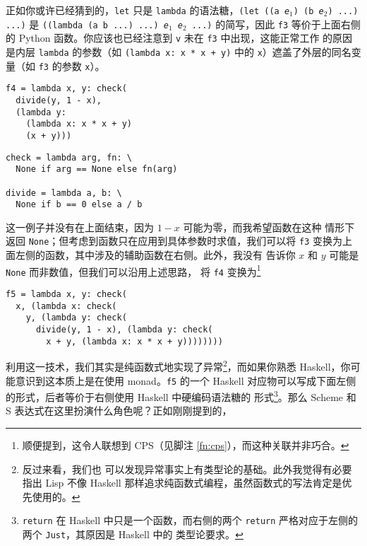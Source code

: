 正如你或许已经猜到的，\verb|let| 只是 \verb|lambda| 的语法糖，\texttt{(let
((a \emph{e$_1$}) (b \emph{e$_2$}) ...) ...)} 是 \texttt{((lambda (a b ...)
...) \emph{e$_1$} \emph{e$_2$} ...)} 的简写，因此 \verb|f3| 等价于上面右侧的
Python 函数。你应该也已经注意到 \verb|v| 未在 \verb|f3| 中出现，这能正常工作
的原因是内层 \verb|lambda| 的参数（如 \texttt{(lambda x: x * x + y)} 中的
\verb|x|）遮盖了外层的同名变量（如 \verb|f3| 的参数 \verb|x|）。

\colskipa\begin{multicols}{2}
\begin{quoting}
\begin{Verbatim}
f4 = lambda x, y: check(
  divide(y, 1 - x),
  (lambda y:
    (lambda x: x * x + y)
    (x + y)))
\end{Verbatim}
\end{quoting}
\begin{quoting}
\begin{Verbatim}
check = lambda arg, fn: \
  None if arg == None else fn(arg)

divide = lambda a, b: \
  None if b == 0 else a / b
\end{Verbatim}
\end{quoting}
\end{multicols}\colskipb
这一例子并没有在上面结束，因为 $1 - x$ 可能为零，而我希望函数在这种
情形下返回 \verb|None|；但考虑到函数只在应用到具体参数时求值，我们可以将
\verb|f3| 变换为上面左侧的函数，其中涉及的辅助函数在右侧。此外，我没有
告诉你 $x$ 和 $y$ 可能是 \verb|None| 而非数值，但我们可以沿用上述思路，
将 \verb|f4| 变换为\footnote{顺便提到，这令人联想到 CPS（见脚注
\ref{fn:cps}），而这种关联并非巧合\cupercite{troelskn2009}。}
\begin{quoting}
\begin{Verbatim}
f5 = lambda x, y: check(
  x, (lambda x: check(
    y, (lambda y: check(
      divide(y, 1 - x), (lambda y: check(
        x + y, (lambda x: x * x + y))))))))
\end{Verbatim}
\end{quoting}
利用这一技术，我们其实是纯函数式地实现了异常\footnote{反过来看，我们也
可以发现异常事实上有类型论的基础。此外我觉得有必要指出 Lisp 不像 Haskell
那样追求纯函数式编程，虽然函数式的写法肯定是优先使用的。}，而如果你熟悉
Haskell，你可能意识到这本质上是在使用 monad。\verb|f5| 的一个 Haskell
对应物可以写成下面左侧的形式，后者等价于右侧使用 Haskell 中硬编码语法糖的
形式\footnote{\texttt{return} 在 Haskell 中只是一个函数，而右侧的两个
\texttt{return} 严格对应于左侧的两个 \texttt{Just}，其原因是 Haskell 中的
类型论要求。}。那么 Scheme 和 S 表达式在这里扮演什么角色呢？正如刚刚提到的，
